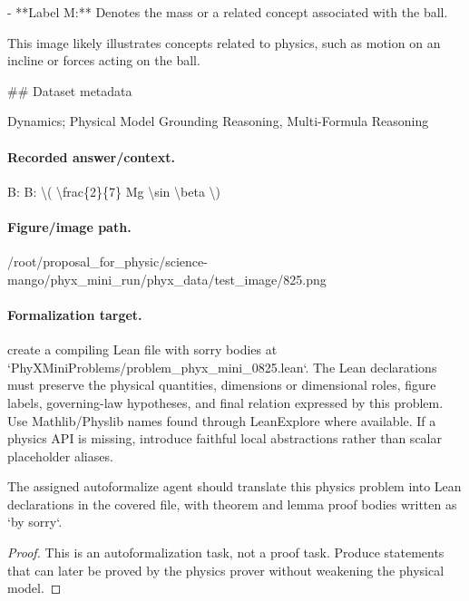 - **Label M:** Denotes the mass or a related concept associated with the ball.

This image likely illustrates concepts related to physics, such as motion on an incline or forces acting on the ball.

\#\# Dataset metadata

Dynamics; Physical Model Grounding Reasoning, Multi-Formula Reasoning

\paragraph{Recorded answer/context.}
B: B: \textbackslash{}( \textbackslash{}frac\{2\}\{7\} Mg \textbackslash{}sin \textbackslash{}beta \textbackslash{})

\paragraph{Figure/image path.}
/root/proposal\_for\_physic/science-mango/phyx\_mini\_run/phyx\_data/test\_image/825.png

\paragraph{Formalization target.}
create a compiling Lean file with sorry bodies at `PhyXMiniProblems/problem\_phyx\_mini\_0825.lean`. The Lean declarations must preserve the physical quantities, dimensions or dimensional roles, figure labels, governing-law hypotheses, and final relation expressed by this problem.
Use Mathlib/Physlib names found through LeanExplore where available. If a physics API is missing, introduce faithful local abstractions rather than scalar placeholder aliases.

\begin{theorem}
\label{thm:physics:phyx_mini_0825:target}
The assigned autoformalize agent should translate this physics problem into Lean declarations in the covered file, with theorem and lemma proof bodies written as `by sorry`.
\end{theorem}
\begin{proof}
This is an autoformalization task, not a proof task. Produce statements that can later be proved by the physics prover without weakening the physical model.
\end{proof}

